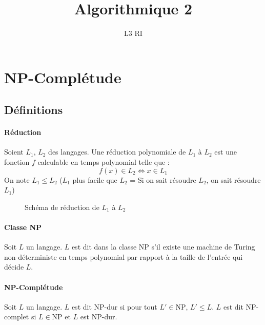 \documentclass[french]{article}
\title{Algorithmique 2}
\date{}
\author{L3 RI}
\newcommand{\NP}{\mathrm{NP}}
\begin{document}
\maketitle
\tableofcontents

\section{NP-Complétude}

\subsection{Définitions}

\paragraph{Réduction} Soient $L_1$, $L_2$ des langages.
Une réduction polynomiale de $L_1$ à $L_2$ est une fonction $f$ calculable en temps polynomial telle que :
	\[ f(x) \in L_2 \Longleftrightarrow x \in L_1 \]
On note $L_1 \leq L_2$ ($L_1$ plus facile que $L_2$ = Si on sait résoudre $L_2$, on sait résoudre $L_1$)

\begin{figure}[H]
\center
{}
\caption{Schéma de réduction de $L_1$ à $L_2$}
\end{figure}

\paragraph{Classe NP}Soit $L$ un langage. $L$ est dit dans la classe NP s'il existe une machine de Turing non-déterministe en temps polynomial par rapport à la taille de l'entrée qui décide $L$.

\paragraph{NP-Complétude} Soit $L$ un langage. $L$ est dit NP-dur si pour tout $L' \in \NP$, $L' \leq L$.
$L$ est dit NP-complet si $L \in \NP$ et $L$ est NP-dur.
\end{document}
